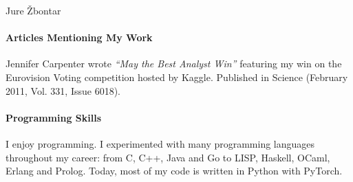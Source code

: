 \documentclass[12pt,a4paper]{article}
\begin{document}
\begin{cv}{Jure \v{Z}bontar}
\paragraph*{Articles Mentioning My Work}
Jennifer Carpenter wrote \textit{``May the Best Analyst Win''} featuring my win on the
Eurovision Voting competition hosted by Kaggle. Published in Science (February
2011, Vol.  331, Issue 6018).

\paragraph*{Programming Skills}
I enjoy programming. I experimented with many programming languages throughout my
career: from C, C++, Java and Go to LISP, Haskell, OCaml, Erlang and Prolog.
Today, most of my code is written in Python with PyTorch.

\end{cv}
\end{document}

